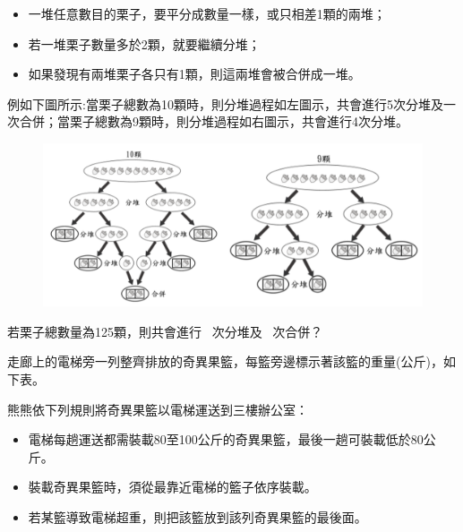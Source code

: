 \documentclass[a4paper, 12pt, addpoints]{exam}
\begin{document}
\begin{questions}
    \begin{itemize}
        \item 一堆任意數目的栗子，要平分成數量一樣，或只相差1顆的兩堆；
        \item 若一堆栗子數量多於2顆，就要繼續分堆；
        \item 如果發現有兩堆栗子各只有1顆，則這兩堆會被合併成一堆。
    \end{itemize}

    例如下圖所示:當栗子總數為10顆時，則分堆過程如左圖示，共會進行5次分堆及一次合併；當栗子總數為9顆時，則分堆過程如右圖示，共會進行4次分堆。
    \begin{figure}[H]
        \centerline{\includegraphics[width=\textwidth]{fig/sq.png}}
    \end{figure}

    若栗子總數量為125顆，則共會進行 \ \underline{\hspace{2em}}次分堆及 \ \underline{\hspace{2em}}次合併？


    \question[4]
    走廊上的電梯旁一列整齊排放的奇異果籃，每籃旁邊標示著該籃的重量(公斤)，如下表。

    \begin{table}[H]
        \centering
    \end{table}
    熊熊依下列規則將奇異果籃以電梯運送到三樓辦公室：

    \begin{itemize}
        \item 電梯每趟運送都需裝載80至100公斤的奇異果籃，最後一趟可裝載低於80公斤。
        \item 裝載奇異果籃時，須從最靠近電梯的籃子依序裝載。
        \item 若某籃導致電梯超重，則把該籃放到該列奇異果籃的最後面。
    \end{itemize}


\end{questions}
\end{document}
